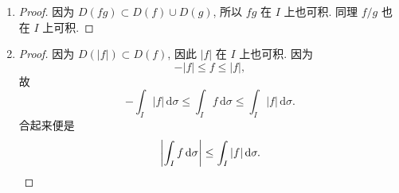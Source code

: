 \begin{enumerate}
\begin{proof}
        \end{proof}
    \item %
        \begin{proof}
            因为 $D(fg) \subset D(f) \cup D(g)$, 所以 $fg$ 在 $I$ 上也可积. 同理 $f/g$ 也在 $I$ 上可积.
        \end{proof}
    \item %
        \begin{proof}
            因为 $D(|f|) \subset D(f)$, 因此 $|f|$ 在 $I$ 上也可积. 因为
            \[
                -|f| \leq f \leq |f|,    
            \]
            故
            \[
                -\int_I|f|\,\mathrm{d}\sigma \leq \int_I f \,\mathrm{d}\sigma \leq \int_I|f|\,\mathrm{d}\sigma.    
            \]
            合起来便是
            \[
                \left|\int_If\,\mathrm{d}\sigma\right| \leq \int_I|f|\,\mathrm{d}\sigma. \qedhere    
            \]
        \end{proof}
\end{enumerate}
% 
